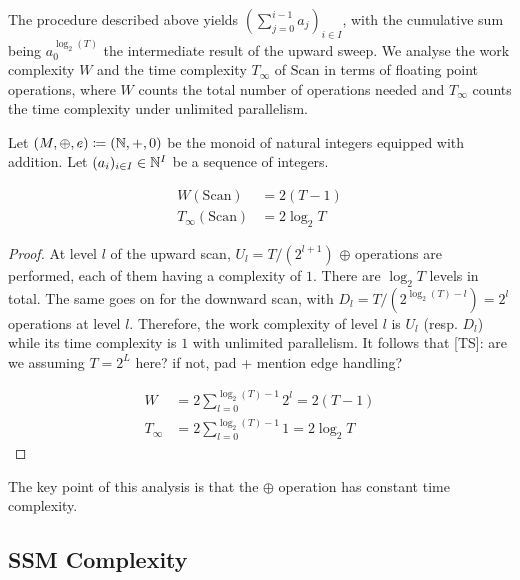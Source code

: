 \documentclass{article}
\newcommand{\TS}[1]{{\color{pink}[TS]: #1}}
\begin{document}
The procedure described above yields $(\sum_{j=0}^{i-1}a_j)_{i\in I}$, with the cumulative sum being $a^{\log_2(T)}_{0}$ the intermediate result of the upward sweep. We analyse the work complexity $W$ and the time complexity $T_\infty$ of $\mathrm{Scan}$ in terms of floating point operations, where $W$ counts the total number of operations needed and $T_\infty$ counts the time complexity under unlimited parallelism.

\begin{proposition}
\label{prop:scan_integer_complexity}
    Let $(M, \oplus, e) \coloneqq (\mathbb{N}, +, 0)$ be the monoid of natural integers equipped with addition. Let $(a_i)_{i\in I}\in \mathbb{N}^I$ be a sequence of integers.

\begin{align}
    W(\mathrm{Scan})&= 2(T-1)\\
    T_\infty(\mathrm{Scan})&= 2\log_2 T
\end{align}
\end{proposition}

\begin{proof}
At level $l$ of the upward scan, $U_l = T/(2^{l+1})$ $\oplus$ operations are performed, each of them having a complexity of $1$. There are $\log_2 T$ levels in total. The same goes on for the downward scan, with $D_l = T/(2^{\log_2(T) - l})=2^{l}$ operations at level $l$. Therefore, the work complexity of level $l$ is $U_l$ (resp. $D_l$) while its time complexity is $1$ with unlimited parallelism. It follows that
\TS{are we assuming $T=2^L$ here? if not, pad + mention edge handling?}

\begin{align}
\label{eq:W_integer}
W &= 2\sum_{l=0}^{\log_2(T)-1}2^l=2(T-1)\\
\label{eq:T_integer}
T_\infty&= 2\sum_{l=0}^{\log_2(T)-1}1=2\log_2T
\end{align}
\end{proof}

The key point of this analysis is that the $\oplus$ operation has constant time complexity.

\subsection{SSM Complexity}
\label{app:SSM_complexity}
\end{document}
